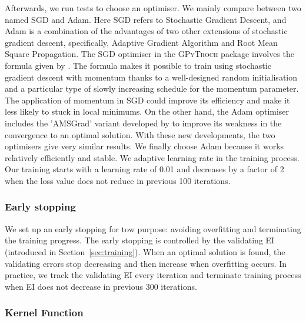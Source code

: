 Afterwards, we run tests to choose an optimiser. We mainly compare between two named SGD and Adam. Here SGD refers to Stochastic Gradient Descent, and Adam is a combination of the advantages of two other extensions of stochastic gradient descent, specifically, Adaptive Gradient Algorithm and Root Mean Square Propagation. 
%
The SGD optimiser in the \textsc{GPyTroch} package involves the formula given by \citet{sutskever2013importance}. The formula makes it possible to train using stochastic gradient descent with momentum thanks to a well-designed random initialisation and a particular type of slowly increasing schedule for the momentum parameter. The application of momentum in SGD could improve its efficiency and make it less likely to stuck in local minimums. On the other hand, the Adam optimiser includes the 'AMSGrad' variant developed by \citet{47409} to improve its weakness in the convergence to an optimal solution. With these new developments, the two optimisers give very similar results. We finally choose Adam because it works relatively efficiently and stable.  
%
We adaptive learning rate in the training process. Our training starts with a learning rate of 0.01 and decreases by a factor of 2 when the loss value does not reduce in previous 100 iterations.    

\subsubsection{Early stopping}

We set up an early stopping for tow purpose: avoiding overfitting and terminating the training progress. 
The early stopping is controlled by the validating EI (introduced in Section~\ref{sec:training}). When an optimal solution is found, the validating errors stop decreasing and then increase when overfitting occurs. In practice, we track the validating EI every iteration and terminate training process when EI does not decrease in previous 300 iterations. 

\subsubsection{Kernel Function}

